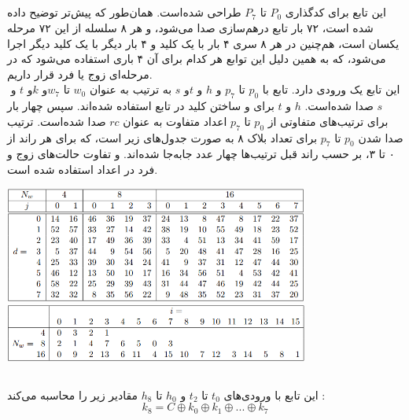 \subsection{}
\label{subsec:TFBIG-4e}
\label{subsec:TFBIG-4o}

این تابع برای کدگذاری $ P_0 $ تا $ P_7 $ طراحی شده‌است. همان‌طور که پیش‌تر توضیح داده شده است، ۷۲ بار تابع درهم‌سازی صدا می‌شود،‌ و هر ۸ سلسله از این ۷۲ مرحله یکسان است، هم‌چنین در هر ۸ سری ۴ بار با یک کلید و ۴ بار دیگر با یک کلید دیگر اجرا می‌شود،‌ که به همین دلیل این توابع  هر کدام برای آن ۴ باری استفاده می‌شود که در مرحله‌ای زوج یا فرد قرار داریم.
\\
این تابع یک ورودی   دارد. تابع   با ‌$ p_0 $ تا  $ p_7 $ و $ h $ و $ t $و ‌$ s $ به ترتیب به عنوان  $ w_0 $ تا $ w_7 $و $ k $و ‌$ t $ و ‌$ s $ صدا شده‌است. ‌$ h $ و $ t $ برای  و ساختن کلید در تابع  استفاده شده‌اند.
سپس  چهار بار برای ترتیب‌های متفاوتی از ‌$ p_0 $ تا $ p_7 $ اعداد متفاوت به عنوان $ rc $ صدا شده‌است. ترتیب صدا شدن $ p_0 $ تا $ p_7 $ برای تعداد بلاک ۸ به صورت جدول‌های زیر است،‌ که برای هر ‌‌راند از ۰ تا ۳، بر حسب راند قبل ترتیب‌ها چهار عدد جابه‌جا شده‌اند. و تفاوت حالت‌های زوج و فرد در اعداد استفاده شده است.
\begin{center}
	\includegraphics[width=10cm]{images/table_mix.png}
	\includegraphics[width= 10cm]{images/Mix2.png}
\end{center}



\subsection{}
\label{subsec:TFBIG-INIT}
این تابع با ورودی‌های $ t_0 $ تا $ t_2 $ و $h_0 $ تا $ h_8 $ مقادیر زیر را محاسبه می‌کند :
$$
k_8 = C \oplus k_0 \oplus k_1 \oplus ... \oplus k_7
$$

